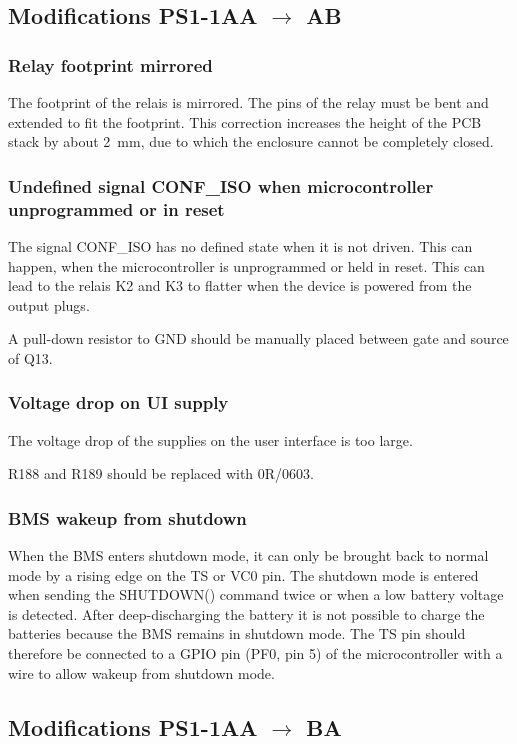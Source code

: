 \FloatBarrier

\subsection{Modifications PS1-1AA $\to$ AB}

\subsubsection{Relay footprint mirrored}
The footprint of the relais is mirrored. The pins of the relay must be bent and extended to fit the footprint. This correction increases the height of the PCB stack by about \qty{2}{\milli\meter}, due to which the enclosure cannot be completely closed. 

\subsubsection{Undefined signal CONF\_ISO when microcontroller unprogrammed or in reset}
The signal CONF\_ISO has no defined state when it is not driven. This can happen, when the microcontroller is unprogrammed or held in reset. This can lead to the relais K2 and K3 to flatter when the device is powered from the output plugs. 

A pull-down resistor to GND should be manually placed between gate and source of Q13. 

\subsubsection{Voltage drop on UI supply}
The voltage drop of the supplies on the user interface is too large. 

R188 and R189 should be replaced with 0R/0603. 

\subsubsection{BMS wakeup from shutdown}
When the BMS enters shutdown mode, it can only be brought back to normal mode by a rising edge on the TS or VC0 pin. The shutdown mode is entered when sending the SHUTDOWN() command twice or when a low battery voltage is detected. After deep-discharging the battery it is not possible to charge the batteries because the BMS remains in shutdown mode. The TS pin should therefore be connected to a GPIO pin (PF0, pin 5) of the microcontroller with a wire to allow wakeup from shutdown mode. 

\subsection{Modifications PS1-1AA $\to$ BA}

